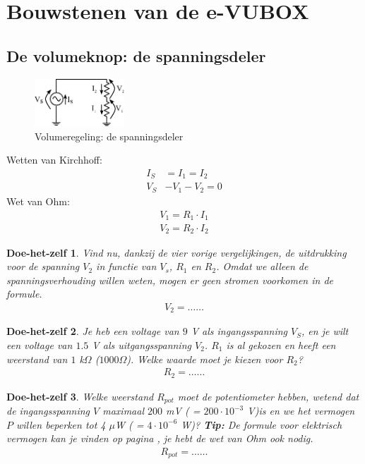 \documentclass{article}
\newtheorem{DIY}{Doe-het-zelf}
\begin{document}
\section{Bouwstenen van de e-VUBOX}
		\subsection{De volumeknop: de spanningsdeler}

			\begin{figure}[htbp]
				\centering
				\includegraphics[width=0.3\textwidth]{weerstandsdeler}
				\caption{Volumeregeling: de spanningsdeler}
				\label{fig:volume}
			\end{figure}

			Wetten van Kirchhoff:
			\begin{align}
			    I_S &= I_1 = I_2 \\
			    V_S &- V_1 -V_2 = 0 
			\end{align}
			Wet van Ohm:
			\begin{align}
			    V_1 = R_1 \cdot I_1 \\
			    V_2 = R_2 \cdot I_2
			\end{align}

			\begin{DIY} Vind nu, dankzij de vier vorige vergelijkingen, de uitdrukking voor de spanning $V_2$ in functie van $V_s$, $R_1$ en $R_2$. Omdat we alleen de spanningsverhouding willen weten, mogen er geen stromen voorkomen in de formule.
			\begin{align*}
			    V_2 = \ldots\ldots
			\end{align*}
			\end{DIY}
\vspace{40ex}
			\begin{DIY} Je heb een voltage van $9$ V als ingangsspanning $V_S$, en je wilt een voltage van $1.5$ V als uitgangsspanning $V_2$. $R_1$ is al gekozen en heeft een weerstand van $1$ k$\Omega$ ($1000 \Omega$). Welke waarde moet je kiezen voor $R_2$?
			\begin{align*}
			    R_2 = \ldots\ldots
			\end{align*}
			\end{DIY}
\vspace{50ex}
			\begin{DIY} Welke weerstand $R_{pot}$ moet de potentiometer hebben, wetend dat de ingangsspanning $V$ maximaal $200$ mV ( = $200 \cdot 10^{-3}$ V)is en we het vermogen $P$ willen beperken tot 4 $\mu$W ( = $4 \cdot 10^{-6}$ W)? \textbf{Tip:} De formule voor elektrisch vermogen kan je vinden op pagina \pageref{eq:vermogen},  je hebt de wet van Ohm ook nodig.
			\begin{align*}
			    R_{pot} = \ldots\ldots
			\end{align*}
			\end{DIY}			
\end{document}

